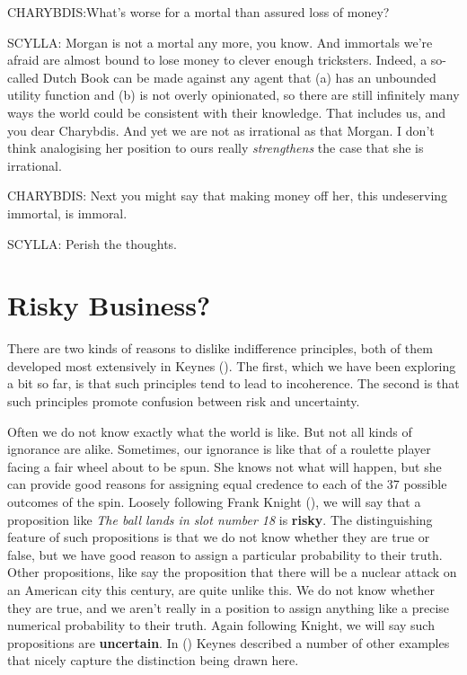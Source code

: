 \documentclass[
  11pt,
  letterpaper,
  DIV=11,
  numbers=noendperiod,
  oneside]{scrartcl}
\begin{document}
CHARYBDIS:What's worse for a mortal than assured loss of money?

SCYLLA: Morgan is not a mortal any more, you know. And immortals we're
afraid are almost bound to lose money to clever enough tricksters.
Indeed, a so-called Dutch Book can be made against any agent that (a)
has an unbounded utility function and (b) is not overly opinionated, so
there are still infinitely many ways the world could be consistent with
their knowledge. That includes us, and you dear
Charybdis. And yet we are not as irrational as that Morgan. I don't
think analogising her position to ours really \emph{strengthens} the
case that she is irrational.

CHARYBDIS: Next you might say that making money off her, this
undeserving immortal, is immoral.

SCYLLA: Perish the thoughts.

\section{Risky Business?}\label{risky-business}

There are two kinds of reasons to dislike indifference principles, both
of them developed most extensively in Keynes
(). The first, which we have been
exploring a bit so far, is that such principles tend to lead to
incoherence. The second is that such principles promote confusion
between risk and uncertainty.

Often we do not know exactly what the world is like. But not all kinds
of ignorance are alike. Sometimes, our ignorance is like that of a
roulette player facing a fair wheel about to be spun. She knows not what
will happen, but she can provide good reasons for assigning equal
credence to each of the 37 possible outcomes of the spin. Loosely
following Frank Knight (), we will say
that a proposition like \emph{The ball lands in slot number 18} is
\textbf{risky}. The distinguishing feature of such propositions is that
we do not know whether they are true or false, but we have good reason
to assign a particular probability to their truth. Other propositions,
like say the proposition that there will be a nuclear attack on an
American city this century, are quite unlike this. We do not know
whether they are true, and we aren't really in a position to assign
anything like a precise numerical probability to their truth. Again
following Knight, we will say such propositions are \textbf{uncertain}.
In () Keynes described a number of other
examples that nicely capture the distinction being drawn here.
\end{document}
